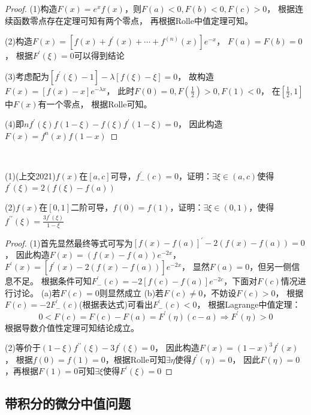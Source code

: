 \begin{proof}
  (1)构造$F(x) = e^x f(x)$，则$F(a) < 0, F(b) < 0, F(c) > 0$，
  根据连续函数零点存在定理可知有两个零点，
  再根据Rolle中值定理可知。

  (2)构造$F(x) = [f(x) + f^{\prime}(x) + \cdots + f^{(n)}(x)]e^{-x}$，
  $F(a) = F(b) = 0$，
  根据$F^{\prime}(\xi) = 0$可以得到结论

  (3)考虑配为$[f^{\prime}(\xi) - 1] - \lambda [f(\xi) - \xi] = 0$，
  故构造$F(x) = [f(x) - x]e^{-\lambda x}$，
  此时$F(0) = 0, F(\frac{1}{2}) > 0, F(1) < 0$，
  在$[\frac{1}{2},1]$中$F(x)$有一个零点，
  根据Rolle可知。

  (4)即$nf^{\prime}(\xi)f(1 - \xi) - f(\xi) f^{\prime}(1 - \xi) = 0$，
  因此构造$F(x) = f^n(x)f(1 - x)$
\end{proof}

~

\begin{exercise}[进阶难度的辅助函数法]
  (1)(上交2021)$f(x)$在$[a,c]$可导，$f^{\prime}_-(c) = 0$，证明：$\exists \xi \in (a,c)$使得$f^{\prime}(\xi) = 2(f(\xi) - f(a))$

  (2)$f(x)$在$[0,1]$二阶可导，$f(0) = f(1)$，证明：$\exists \xi \in (0,1)$，使得$f^{\prime\prime}(\xi) = \frac{3f^{\prime}(\xi)}{1 - \xi}$
\end{exercise}

\begin{proof}
  (1)首先显然最终等式可写为$[f(x) - f(a)]^{\prime} - 2(f(x) - f(a)) = 0$，
  因此构造$F(x) = (f(x) - f(a))e^{-2x}$，
  $F^{\prime}(x) = [f^{\prime}(x) - 2(f(x) - f(a))]e^{-2x}$，
  显然$F(a) = 0$，但另一侧信息不足。
  根据条件可知$F_-^{\prime}(c) = -2 [f(c) - f(a)]e^{-2c}$，下面对$F(c)$情况进行讨论。
  (a)若$F(c) = 0$则显然成立
  (b)若$F(c) \neq 0$，不妨设$F(c) > 0$，
  根据$F(c) = -2F^{\prime}_-(c)$(根据表达式)可看出$F_-^{\prime}(c) < 0$，
  根据Lagrange中值定理：
  \begin{equation*}
    0 < F(c) = F(c) - F(a) = F^{\prime}(\eta)(c - a) \Rightarrow F^{\prime}(\eta) > 0
  \end{equation*}
  根据导数介值性定理可知结论成立。

  (2)等价于$(1 - \xi)f^{\prime\prime}(\xi) - 3f^{\prime}(\xi) = 0$，
  因此构造$F(x) = (1 - x)^3f^{\prime}(x)$，
  根据$f(0) = f(1) = 0$，根据Rolle可知$\exists \eta$使得$f^{\prime}(\eta ) = 0$，
  因此$F(\eta) = 0$，再根据$F(1) = 0$可知$\exists \xi$使得$F^{\prime}(\xi) = 0$
\end{proof}

\subsection{带积分的微分中值问题}

